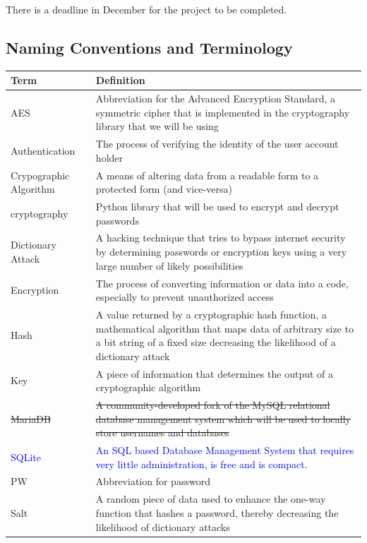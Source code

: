 \documentclass[12pt, titlepage]{article}
\begin{document}
There is a deadline in December for the project to be completed.

\subsection{Naming Conventions and Terminology}
\begin{table}[H]
\centering
{}
\begin{tabular}{ | p{3cm} | p{10.5cm} | }
	\hline
	Term & Definition \\
	\hline
	AES & Abbreviation for the Advanced Encryption Standard, a symmetric cipher that is implemented in the cryptography library that we will be using \\
	\hline
	Authentication & The process of verifying the identity of the user account holder  \\
	\hline
	Crypographic Algorithm & A means of altering data from a readable form to a protected form (and vice-versa) \\
	\hline
	cryptography & Python library that will be used to encrypt and decrypt passwords \\
	\hline
	Dictionary Attack & A hacking technique that tries to bypass internet security by determining passwords or encryption keys using a very large number of likely possibilities \\
	\hline
	Encryption & The process of converting information or data into a code, especially to prevent unauthorized access \\
	\hline
	Hash & A value returned by a cryptographic hash function, a mathematical algorithm that maps data of arbitrary size to a bit string of a fixed size decreasing the likelihood of a dictionary attack \\
	\hline
	Key & A piece of information that determines the output of a cryptographic algorithm \\
	\hline
	\sout{MariaDB} & \sout{A community-developed fork of the MySQL relational database management system which will be used to locally store usernames and databases} \\
	\hline
	\textcolor{blue}{SQLite} & \textcolor{blue}{An SQL based Database Management System that requires very little administration, is free and is compact.}\\
	\hline
	PW & Abbreviation for password \\
	\hline
	Salt & A random piece of data used to enhance the one-way function that hashes a password, thereby decreasing the likelihood of dictionary attacks \\

\end{tabular}
\end{table}
\end{document}
